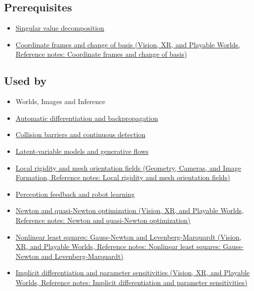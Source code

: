 \subsection{Prerequisites}\label{appendix-29f4bea4c2bb-prerequisites}

\begin{itemize}
\tightlist
\item
  \hyperref[appendix-1fad5e7f36fa]{Singular value decomposition}
\item
  \href{../07-Vision-XR-and-Playable-Worlds/main.pdf\#nameddest=appendix-1bae9457dbc3}{Coordinate frames and change of basis (Vision, XR, and Playable Worlds, Reference notes: Coordinate frames and change of basis)}
\end{itemize}

\subsection{Used by}\label{appendix-29f4bea4c2bb-used-by}

\begin{itemize}
\item
  {Worlds, Images and Inference}
\item
  \hyperref[appendix-40df0855b4a7]{Automatic differentiation and backpropagation}
\item
  \hyperref[appendix-a9ba01fa72a6]{Collision barriers and continuous detection}
\item
  \hyperref[appendix-2c568f05ee34]{Latent-variable models and generative flows}
\item
  \href{../03-Geometry-Cameras-and-Image-Formation/main.pdf\#nameddest=appendix-7107009c505b}{Local rigidity and mesh orientation fields (Geometry, Cameras, and Image Formation, Reference notes: Local rigidity and mesh orientation fields)}
\item
  \hyperref[appendix-b0c42da325f1]{Perception feedback and robot learning}
\item
  \href{../07-Vision-XR-and-Playable-Worlds/main.pdf\#nameddest=appendix-54c8f5828387}{Newton and quasi-Newton optimization (Vision, XR, and Playable Worlds, Reference notes: Newton and quasi-Newton optimization)}
\item
  \href{../07-Vision-XR-and-Playable-Worlds/main.pdf\#nameddest=appendix-2c2df8345991}{Nonlinear least squares: Gauss-Newton and Levenberg-Marquardt (Vision, XR, and Playable Worlds, Reference notes: Nonlinear least squares: Gauss-Newton and Levenberg-Marquardt)}
\item
  \href{../07-Vision-XR-and-Playable-Worlds/main.pdf\#nameddest=appendix-8836553d56fc}{Implicit differentiation and parameter sensitivities (Vision, XR, and Playable Worlds, Reference notes: Implicit differentiation and parameter sensitivities)}
\end{itemize}


